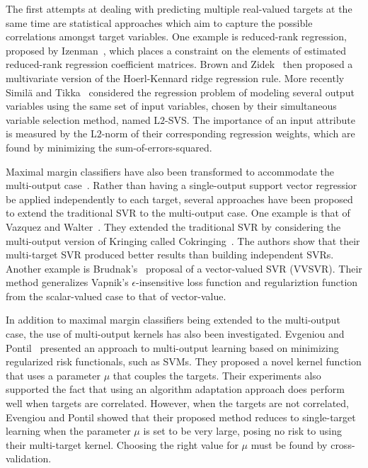 \documentclass[reqno]{vcuthesis}
\numberwithin{equation}{chapter}
\begin{document}
The first attempts at dealing with predicting multiple real-valued targets at the same time are statistical approaches which aim to capture the possible correlations amongst target variables. One example is reduced-rank regression, proposed by Izenman~\cite{izenman1975reduced}, which places a constraint on the elements of estimated reduced-rank regression coefficient matrices. Brown and Zidek~\cite{brown1980adaptive} then proposed a multivariate version of the Hoerl-Kennard ridge regression rule. More recently Simil{\"a} and Tikka~\cite{simila2007input} considered the regression problem of modeling several output variables using the same set of input variables, chosen by their simultaneous variable selection method, named L$2$-SVS. The importance of an input attribute is measured by the L$2$-norm of their corresponding regression weights, which are found by minimizing the sum-of-errors-squared.

Maximal margin classifiers have also been transformed to accommodate the multi-output case~\cite{tsochantaridis2005large}. Rather than having a single-output support vector regressior be applied independently to each target, several approaches have been proposed to extend the traditional SVR to the multi-output case. One example is that of Vazquez and Walter~\cite{vazquez2003multi}. They extended the traditional SVR by considering the multi-output version of Kringing called Cokringing~\cite{chiles1999}. The authors show that their multi-target SVR produced better results than building independent SVRs. Another example is Brudnak's~\cite{brudnak2006vector} proposal of a vector-valued SVR (VVSVR). Their method generalizes Vapnik's $\epsilon$-insensitive loss function and regulariztion function from the scalar-valued case to that of vector-value.

In addition to maximal margin classifiers being extended to the multi-output case, the use of multi-output kernels has also been investigated. Evgeniou and Pontil~\cite{evgeniou2004regularized} presented an approach to multi-output learning based on minimizing regularized risk functionals, such as SVMs. They proposed a novel kernel function that uses a parameter $\mu$ that couples the targets. Their experiments also supported the fact that using an algorithm adaptation approach does perform well when targets are correlated. However, when the targets are not correlated, Evengiou and Pontil showed that their proposed method reduces to single-target learning when the parameter $\mu$ is set to be very large, posing no risk to using their multi-target kernel. Choosing the right value for $\mu$ must be found by cross-validation. 
\end{document}
